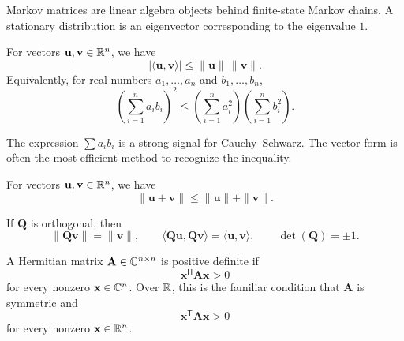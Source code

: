     \begin{remark}
        Markov matrices are linear algebra objects behind finite-state Markov
        chains. A stationary distribution is an eigenvector corresponding to the
        eigenvalue $1$.
    \end{remark}

    \begin{theorem}
        For vectors $\mathbf{u},\mathbf{v}\in\mathbb{R}^n$, we have
        \[
            |\langle\mathbf{u},\mathbf{v}\rangle|
            \leq
            \|\mathbf{u}\|\,\|\mathbf{v}\|.
        \]
        Equivalently, for real numbers $a_1,\dots,a_n$ and
        $b_1,\dots,b_n$,
        \[
            \left(\sum_{i=1}^{n}a_i b_i\right)^2
            \leq
            \left(\sum_{i=1}^{n}a_i^2\right)
            \left(\sum_{i=1}^{n}b_i^2\right).
        \]
    \end{theorem}

    \begin{strategy}
        The expression $\sum a_i b_i$ is a strong signal for Cauchy--Schwarz.
        The vector form is often the most efficient method to recognize the inequality.
    \end{strategy}

    \begin{corollary}
        For vectors $\mathbf{u},\mathbf{v}\in\mathbb{R}^n$, we have
        \[
            \|\mathbf{u}+\mathbf{v}\|
            \leq
            \|\mathbf{u}\|+\|\mathbf{v}\|.
        \]
    \end{corollary}

    \begin{proposition}
        If $\mathbf{Q}$ is orthogonal, then
        \[
            \|\mathbf{Q}\mathbf{v}\|=\|\mathbf{v}\|,
            \qquad
            \langle\mathbf{Q}\mathbf{u},\mathbf{Q}\mathbf{v}\rangle
            =
            \langle\mathbf{u},\mathbf{v}\rangle,
            \qquad
            \det(\mathbf{Q})=\pm 1.
        \]
    \end{proposition}

    \begin{definition}
        A Hermitian matrix $\mathbf{A}\in\mathbb{C}^{n\times n}$ is positive definite if
        \[
            \mathbf{x}^{\mathsf H}\mathbf{A}\mathbf{x}>0
        \]
        for every nonzero $\mathbf{x}\in\mathbb{C}^n$. Over $\mathbb{R}$, this is the familiar
        condition that $\mathbf{A}$ is symmetric and
        \[
            \mathbf{x}^{\mathsf T}\mathbf{A}\mathbf{x}>0
        \]
        for every nonzero $\mathbf{x}\in\mathbb{R}^n$.
    \end{definition}

